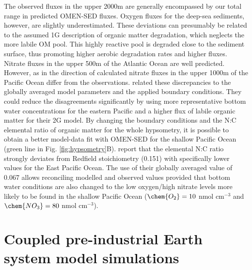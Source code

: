 \documentclass[gmd, manuscript]{copernicus}
\begin{document}
The observed  fluxes in the upper 2000m are generally encompassed by our total range in predicted OMEN-SED fluxes. Oxygen fluxes for the deep-sea sediments, however, are slightly underestimated. 
These deviations can presumably be related to the assumed 1G description of organic matter degradation, which neglects the more labile OM pool. This highly reactive pool is degraded close to the sediment surface, 
thus promoting higher aerobic degradation rates and higher  fluxes.  
Nitrate fluxes in the upper 500m of the Atlantic Ocean are well predicted. However, as in \citet{middelburg_denitrification_1996} the direction of calculated nitrate fluxes in the upper 1000m of the Pacific Ocean differ from the observations. 
\citet{middelburg_denitrification_1996} related these discrepancies to the globally averaged model parameters and the applied boundary conditions. They could reduce the disagreements significantly by using more representative 
bottom water concentrations for the eastern Pacific and a higher flux of labile organic matter for their 2G model. By changing the boundary conditions and the N:C elemental ratio of organic matter for the whole hypsometry, it is possible 
to obtain a better model-data fit with OMEN-SED for the shallow Pacific Ocean (green line in Fig. \ref{fig:hypsometry}B). 
\citet{bohlen_simple_2012} report that the elemental N:C ratio strongly deviates from Redfield stoichiometry (0.151) with specifically lower values for the East Pacific Ocean. The use of their globally averaged value of 0.067 allows 
reconciling modelled and observed values provided that bottom water conditions are also changed to the low oxygen/high nitrate levels more likely to be found in the shallow Pacific Ocean 
($\chem{O_2} = 10$ nmol cm$^{-3}$ and $\chem{NO_3} = 80$ nmol cm$^{-3}$). 


\section{Coupled pre-industrial Earth system model simulations}\label{sec:ESM_coupling}
\end{document}
